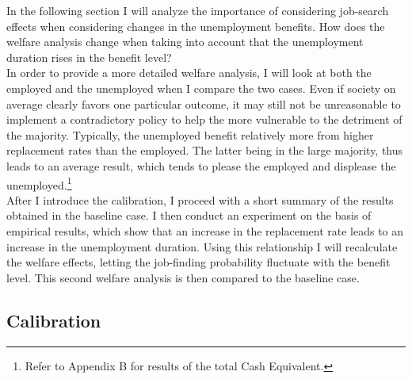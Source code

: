 \documentclass[a4paper,11pt]{article}
\begin{document}
In the following section I will analyze the importance of considering job-search effects when considering changes in the unemployment benefits. How does the welfare analysis change when taking into account that the unemployment duration rises in the benefit level? \\
In order to provide a more detailed welfare analysis, I will look at both the employed and the unemployed when I compare the two cases. Even if society on average clearly favors one particular outcome, it may still not be unreasonable to implement a contradictory policy to help the more vulnerable to the detriment of the majority. Typically, the unemployed benefit relatively more from higher replacement rates than the employed. The latter being in the large majority, thus leads to an average result, which tends to please the employed and displease the unemployed.\footnote{Refer to Appendix B for results of the total Cash Equivalent.}
\\ 
After I introduce the calibration, I proceed with a short summary of the results obtained in the baseline case. I then conduct an experiment on the basis of empirical results, which show that an increase in the replacement rate leads to an increase in the unemployment duration. Using this relationship I will recalculate the welfare effects, letting the job-finding probability fluctuate with the benefit level. This second welfare analysis is then compared to the baseline case. 


\subsection{Calibration}
\end{document}
